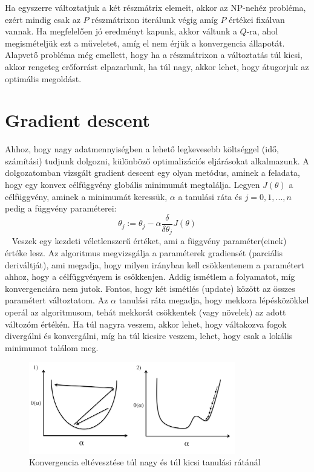 \documentclass[a4paper,12pt]{article}
\begin{document}
Ha egyszerre változtatjuk a két részmátrix elemeit, akkor az NP-nehéz probléma, ezért mindig csak az $P$ részmátrixon iterálunk végig amíg $P$ értékei fixálvan vannak. Ha megfelelően jó eredményt kapunk, akkor váltunk a $Q$-ra, ahol megismételjük ezt a műveletet, amíg el nem érjük a konvergencia állapotát. Alapvető probléma még emellett, hogy ha a részmátrixon a változtatás túl kicsi, akkor rengeteg erőforrást elpazarlunk, ha túl nagy, akkor lehet, hogy átugorjuk az optimális megoldást.

\section{Gradient descent}

Ahhoz, hogy nagy adatmennyiségben a lehető legkevesebb költséggel (idő, számítási) tudjunk dolgozni, különböző optimalizációs eljárásokat alkalmazunk. A dolgozatomban vizsgált gradient descent egy olyan metódus, aminek a feladata, hogy egy konvex célfüggvény globális minimumát megtalálja. Legyen $J(\theta)$ a célfüggvény, aminek a minimumát keressük, $\alpha$ a tanulási ráta és $j=0, 1, ..., n$ pedig a függvény paraméterei:
\[\theta_j:=\theta_j-\alpha\frac{\delta}{\delta\theta_j}J(\theta)\]~\cite{andrewml}
Veszek egy kezdeti véletlenszerű értéket, ami a függvény paraméter(einek) értéke lesz. Az algoritmus megvizsgálja a paraméterek gradiensét (parciális deriváltját), ami megadja, hogy milyen irányban kell csökkentenem a paramétert ahhoz, hogy a célfüggvényem is csökkenjen. Addig ismétlem a folyamatot, míg konvergenciára nem jutok. Fontos, hogy két ismétlés (update) között az összes paramétert változtatom. \linebreak
Az $\alpha$ tanulási ráta megadja, hogy mekkora lépésközökkel operál az algoritmusom, tehát mekkorát csökkentek (vagy növelek) az adott változóm értékén. Ha túl nagyra veszem, akkor lehet, hogy váltakozva fogok divergálni és konvergálni, míg ha túl kicsire veszem, lehet, hogy csak a lokális minimumot találom meg.

\begin{figure}[ht!]
\centering
\includegraphics[width=90mm]{img/alfa.png}
\caption{Konvergencia eltévesztése túl nagy és túl kicsi tanulási rátánál \label{alfa}}
\end{figure}

\end{document}
